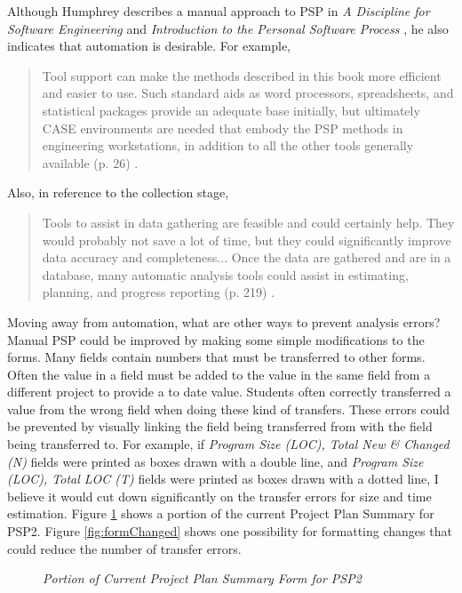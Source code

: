 Although Humphrey describes a manual approach to PSP in {\it A Discipline for
Software Engineering} \cite{Humphrey95} and {\it Introduction to the Personal
Software Process} \cite{Humphrey97}, he also indicates that automation is
desirable.  For example, 
\begin{quote}
Tool support can make the methods described in
this book more efficient and easier to use.  Such standard aids as word
processors, spreadsheets, and statistical packages provide an adequate base 
initially, but ultimately CASE environments are needed that embody the PSP
methods in engineering workstations, in addition to all the other tools
generally available (p. 26) \cite{Humphrey95}.
\end{quote}
Also, in reference to the collection stage,
\begin{quote}
Tools to assist in data gathering are feasible and could certainly
help.  They would probably not save a lot of time, but they could
significantly improve data accuracy and completeness... Once the data are
gathered and are in a database, many automatic analysis tools could assist
in estimating, planning, and progress reporting (p. 219) \cite{Humphrey95}.
\end{quote}

Moving away from automation, what are other ways to prevent analysis
errors?  Manual PSP could be improved by making some simple modifications
to the forms.  Many fields contain numbers that must be transferred to
other forms.  Often the value in a field must be added to the value in the
same field from a different project to provide a to date value.  Students
often correctly transferred a value from the wrong field when doing these
kind of transfers.  These errors could be prevented by visually linking the
field being transferred from with the field being transferred to.  For
example, if {\it Program Size (LOC), Total New \& Changed (N)} fields were
printed as boxes drawn with a double line, and {\it Program Size (LOC),
  Total LOC (T)} fields were printed as boxes drawn with a dotted line, I
believe it would cut down significantly on the transfer errors for size and
time estimation.  Figure \ref{fig:formBefore} shows a portion of the
current Project Plan Summary for PSP2.  Figure \ref{fig:formChanged} shows
one possibility for formatting changes that could reduce the number of
transfer errors.

\begin{figure}[p] 
    {\centerline{}}
    \caption[Current Project Plan Summary Form]{\label{fig:formBefore} 
      {\em Portion of Current Project Plan Summary Form for PSP2}}
\end{figure}

